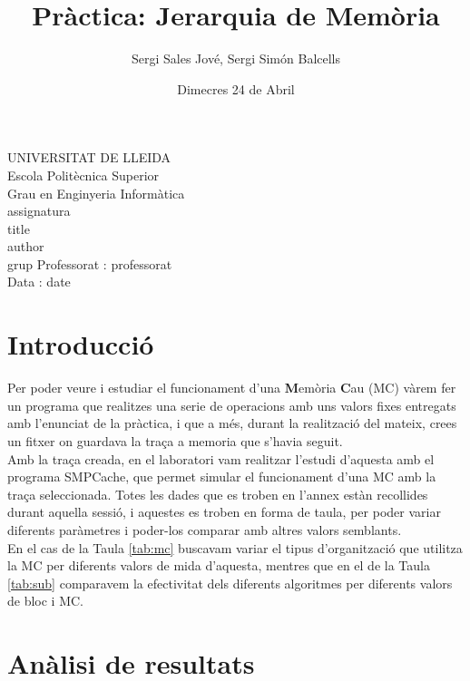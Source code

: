 \documentclass{article}
\title{Pràctica: Jerarquia de Memòria}
\author{Sergi Sales Jové, Sergi Simón Balcells}
\date{Dimecres 24 de Abril}
\renewcommand{\maketitle}{ %
    \begin{titlepage}
        \raggedright{UNIVERSITAT DE LLEIDA \\
            Escola Politècnica Superior \\
            Grau en Enginyeria Informàtica\\
            \1assignatura\\}
            \vspace{5cm}
            \centering\huge{\5title \\}
            \vspace{3cm}
            \large{\6author} \\
            \normalsize{\3grup}
            \vfill
            Professorat : \4professorat \\
            Data : \7date
\end{titlepage}}
\begin{document}
\maketitle
\thispagestyle{empty}

\newpage
{}
\tableofcontents
\newpage
{}
\section{Introducció}
Per poder veure i estudiar el funcionament d'una \textbf{M}emòria \textbf{C}au (MC) vàrem fer un
 programa que realitzes una serie de operacions amb uns valors fixes entregats amb l'enunciat de 
la pràctica, i que a més, durant la realització del mateix, crees un fitxer on guardava la traça a memoria 
que s'havia seguit.\\
Amb la traça creada, en el laboratori vam realitzar l'estudi d'aquesta amb el programa SMPCache, que permet simular 
el funcionament d'una MC amb la traça seleccionada. Totes les dades que es troben en l'annex estàn recollides durant aquella sessió,
i aquestes es troben en forma de taula, per poder variar diferents paràmetres i poder-los comparar amb altres valors semblants.\\
En el cas de la Taula \ref{tab:mc} buscavam variar el tipus d'organització que utilitza la MC per diferents valors de mida d'aquesta, mentres que en el de la Taula \ref{tab:sub} comparavem la efectivitat dels diferents algoritmes per diferents valors de bloc i MC.\\
\section{Anàlisi de resultats}
\end{document}
